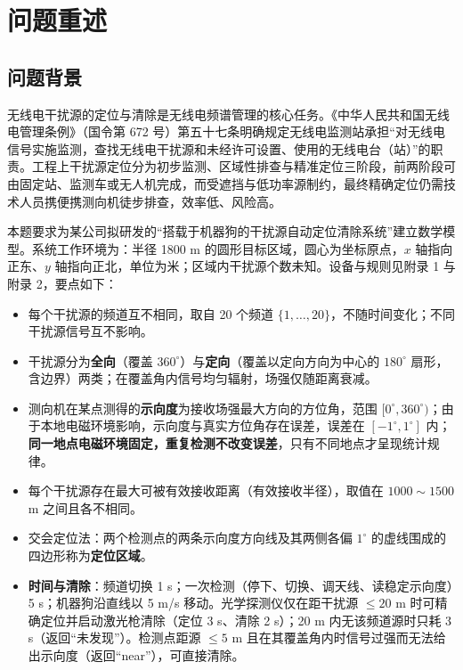 \documentclass{cumcmthesis}
\begin{document}
\thispagestyle{empty}

\section{问题重述}

\subsection{问题背景}

无线电干扰源的定位与清除是无线电频谱管理的核心任务。《中华人民共和国无线电管理条例》（国令第 672 号）第五十七条明确规定无线电监测站承担“对无线电信号实施监测，查找无线电干扰源和未经许可设置、使用的无线电台（站）”的职责\cite{reg672}。工程上干扰源定位分为初步监测、区域性排查与精准定位三阶段，前两阶段可由固定站、监测车或无人机完成，而受遮挡与低功率源制约，最终精确定位仍需技术人员携便携测向机徒步排查，效率低、风险高。

本题要求为某公司拟研发的“搭载于机器狗的干扰源自动定位清除系统”建立数学模型。系统工作环境为：半径 1800 m 的圆形目标区域，圆心为坐标原点，$x$ 轴指向正东、$y$ 轴指向正北，单位为米；区域内干扰源个数未知。设备与规则见附录 1 与附录 2，要点如下：

\begin{itemize}
  \item 每个干扰源的频道互不相同，取自 20 个频道 $\{1,\dots,20\}$，不随时间变化；不同干扰源信号互不影响。
  \item 干扰源分为\textbf{全向}（覆盖 $360^{\circ}$）与\textbf{定向}（覆盖以定向方向为中心的 $180^{\circ}$ 扇形，含边界）两类；在覆盖角内信号均匀辐射，场强仅随距离衰减。
  \item 测向机在某点测得的\textbf{示向度}为接收场强最大方向的方位角，范围 $[0^{\circ},360^{\circ})$；由于本地电磁环境影响，示向度与真实方位角存在误差，误差在 $[-1^{\circ},1^{\circ}]$ 内；\textbf{同一地点电磁环境固定，重复检测不改变误差}，只有不同地点才呈现统计规律。
  \item 每个干扰源存在最大可被有效接收距离（有效接收半径），取值在 $1000\sim1500$ m 之间且各不相同。
  \item 交会定位法：两个检测点的两条示向度方向线及其两侧各偏 $1^{\circ}$ 的虚线围成的四边形称为\textbf{定位区域}。
  \item \textbf{时间与清除}：频道切换 1 s；一次检测（停下、切换、调天线、读稳定示向度）5 s；机器狗沿直线以 5 m/s 移动。光学探测仪仅在距干扰源 $\le20$ m 时可精确定位并启动激光枪清除（定位 3 s、清除 2 s）；20 m 内无该频道源时只耗 3 s（返回“未发现”）。检测点距源 $\le5$ m 且在其覆盖角内时信号过强而无法给出示向度（返回“near”），可直接清除。
\end{itemize}
\end{document}
